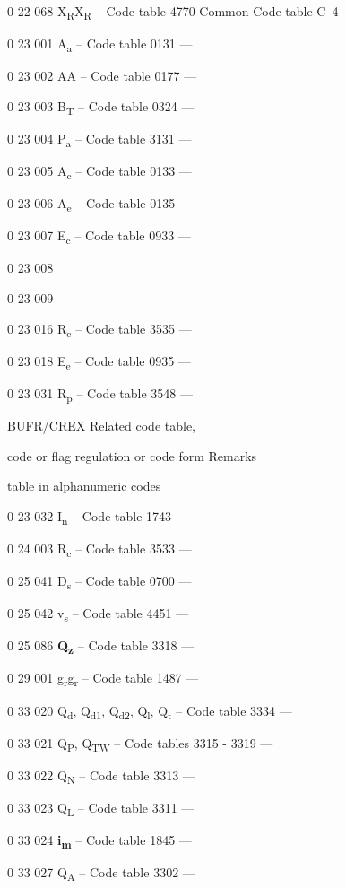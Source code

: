 0 22 068 X\textsubscript{R}X\textsubscript{R} -- Code table 4770 Common Code table C--4

0 23 001 A\textsubscript{a} -- Code table 0131 ---

0 23 002 AA -- Code table 0177 ---

0 23 003 B\textsubscript{T} -- Code table 0324 ---

0 23 004 P\textsubscript{a} -- Code table 3131 ---

0 23 005 A\textsubscript{c} -- Code table 0133 ---

0 23 006 A\textsubscript{e} -- Code table 0135 ---

0 23 007 E\textsubscript{c} -- Code table 0933 ---

0 23 008

0 23 009

0 23 016 R\textsubscript{e} -- Code table 3535 ---

0 23 018 E\textsubscript{e} -- Code table 0935 ---

0 23 031 R\textsubscript{p} -- Code table 3548 ---

BUFR/CREX Related code table,

code or flag regulation or code form Remarks

table in alphanumeric codes

0 23 032 I\textsubscript{n} -- Code table 1743 ---

0 24 003 R\textsubscript{c} -- Code table 3533 ---

0 25 041 D\textsubscript{s} -- Code table 0700 ---

0 25 042 v\textsubscript{s} -- Code table 4451 ---

0 25 086 \textbf{Q\textsubscript{z}} -- Code table 3318 ---

0 29 001 g\textsubscript{r}g\textsubscript{r} -- Code table 1487 ---

0 33 020 Q\textsubscript{d}, Q\textsubscript{d1}, Q\textsubscript{d2}, Q\textsubscript{l}, Q\textsubscript{t} -- Code table 3334 ---

0 33 021 Q\textsubscript{P}, Q\textsubscript{TW} -- Code tables 3315 - 3319 ---

0 33 022 Q\textsubscript{N} -- Code table 3313 ---

0 33 023 Q\textsubscript{L} -- Code table 3311 ---

0 33 024 \textbf{i\textsubscript{m}} -- Code table 1845 ---

0 33 027 Q\textsubscript{A} -- Code table 3302 ---

